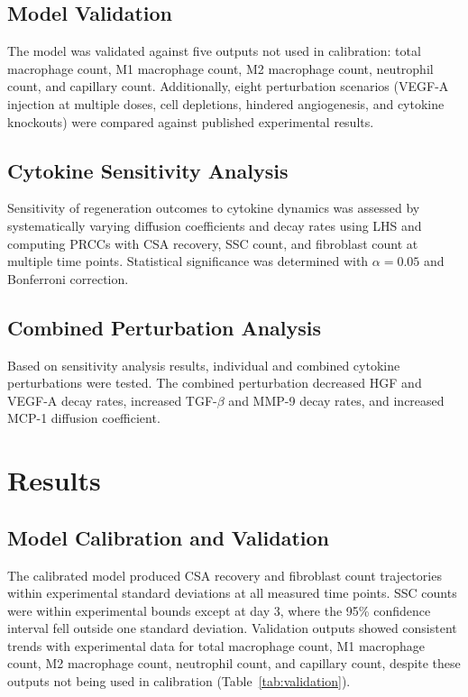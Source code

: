 \documentclass[11pt]{article}
\begin{document}
\subsection{Model Validation}

The model was validated against five outputs not used in calibration: total macrophage count, M1 macrophage count, M2 macrophage count, neutrophil count, and capillary count. Additionally, eight perturbation scenarios (VEGF-A injection at multiple doses, cell depletions, hindered angiogenesis, and cytokine knockouts) were compared against published experimental results.

\subsection{Cytokine Sensitivity Analysis}

Sensitivity of regeneration outcomes to cytokine dynamics was assessed by systematically varying diffusion coefficients and decay rates using LHS and computing PRCCs with CSA recovery, SSC count, and fibroblast count at multiple time points. Statistical significance was determined with $\alpha = 0.05$ and Bonferroni correction.

\subsection{Combined Perturbation Analysis}

Based on sensitivity analysis results, individual and combined cytokine perturbations were tested. The combined perturbation decreased HGF and VEGF-A decay rates, increased TGF-$\beta$ and MMP-9 decay rates, and increased MCP-1 diffusion coefficient.

\section{Results}

\subsection{Model Calibration and Validation}

The calibrated model produced CSA recovery and fibroblast count trajectories within experimental standard deviations at all measured time points. SSC counts were within experimental bounds except at day 3, where the 95\% confidence interval fell outside one standard deviation. Validation outputs showed consistent trends with experimental data for total macrophage count, M1 macrophage count, M2 macrophage count, neutrophil count, and capillary count, despite these outputs not being used in calibration (Table~\ref{tab:validation}).
\end{document}
